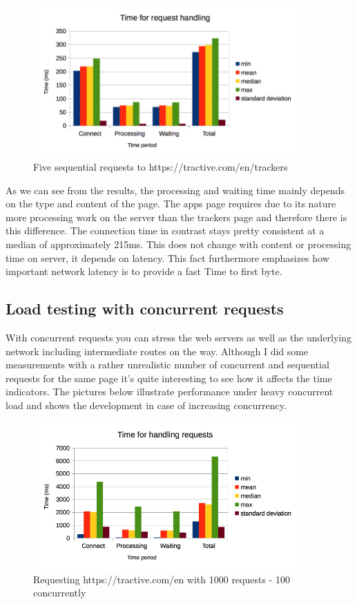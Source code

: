 \begin{figure}[h!]
	\centering
		\includegraphics[width=0.9\textwidth]{imgs/seq_req_trackers.png}
	\caption{Five sequential requests to https://tractive.com/en/trackers}
\end{figure}

As we can see from the results, the processing and waiting time mainly depends on the type and content of the page. The apps page requires due to its nature more processing work on the server than the trackers page and therefore there is this difference. The connection time in contrast stays pretty consistent at a median of approximately 215ms. This does not change with content or processing time on server, it depends on latency. This fact furthermore emphasizes how important network latency is to provide a fast Time to first byte.

\subsection{Load testing with concurrent requests}
With concurrent requests you can stress the web servers as well as the underlying network including intermediate routes on the way. Although I did some measurements with a rather unrealistic number of concurrent and sequential requests for the same page it's quite interesting to see how it affects the time indicators. The pictures below illustrate performance under heavy concurrent load and shows the development in case of increasing concurrency.

\begin{figure}[h!]
	\centering
		\includegraphics[width=0.9\textwidth]{imgs/con_req100.png}
	\caption{Requesting https://tractive.com/en with 1000 requests - 100 concurrently}
\end{figure}


